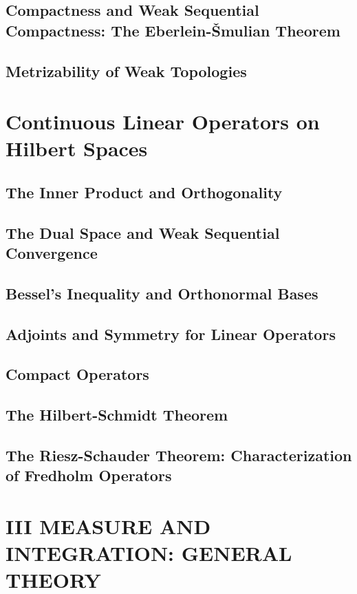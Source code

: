 \documentclass[a4paper,10pt]{book}
\theoremstyle{plain} %
\begin{document}
\section{Compactness and Weak Sequential Compactness: The Eberlein-\v Smulian Theorem}
\section{Metrizability of Weak Topologies}

\chapter{Continuous Linear Operators on Hilbert Spaces}

\section{The Inner Product and Orthogonality}
\section{The Dual Space and Weak Sequential Convergence}
\section{Bessel's Inequality and Orthonormal Bases}
\section{Adjoints and Symmetry for Linear Operators}
\section{Compact Operators}
\section{The Hilbert-Schmidt Theorem}
\section{The Riesz-Schauder Theorem: Characterization of Fredholm Operators}

\setcounter{chapter}{0}
\chapter*{III MEASURE AND INTEGRATION: GENERAL THEORY} 
\setcounter{chapter}{16}
\end{document}
